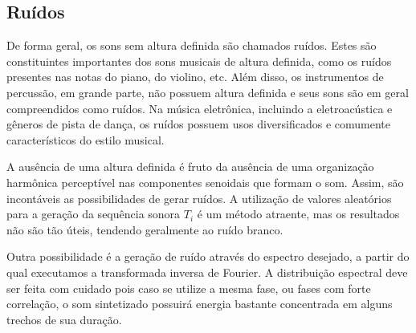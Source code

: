 \subsection{Ruídos}\label{subsec:ruidos}
De forma geral, os sons sem altura definida 
são chamados ruídos.\cite{Lacerda}
Estes são constituintes importantes dos sons musicais de altura definida,
como os ruídos presentes nas notas do piano, do violino, etc. Além disso, os instrumentos
de percussão, em grande parte, não possuem altura definida e seus sons
são em geral compreendidos como ruídos.\cite{Roederer} Na música eletrônica, incluindo
a eletroacústica e gêneros de pista de dança, os ruídos possuem usos diversificados e comumente
característicos do estilo musical.\cite{Cook}

A ausência de uma altura definida é fruto da ausência de uma organização harmônica perceptível nas componentes senoidais que formam o som. Assim,
são incontáveis as possibilidades de gerar ruídos.
A utilização
de valores aleatórios para a geração da sequência sonora $T_i$
é um método atraente,
mas os resultados não são tão úteis, tendendo geralmente ao ruído branco.\cite{Cook}

Outra possibilidade é a geração de ruído através do espectro desejado, a partir
do qual executamos a transformada inversa de Fourier.
A distribuição espectral deve ser feita com cuidado 
pois caso se utilize a mesma fase,
ou fases com forte correlação, 
o som sintetizado possuirá energia bastante concentrada
em alguns trechos de sua duração.


